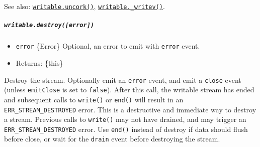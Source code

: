 See also: \hyperref[writableuncork]{\texttt{writable.uncork()}},
\hyperref[writable_writevchunks-callback]{\texttt{writable.\_writev()}}.

\subparagraph{\texorpdfstring{\texttt{writable.destroy({[}error{]})}}{writable.destroy({[}error{]})}}\label{writable.destroyerror}

\begin{itemize}
\tightlist
\item
  \texttt{error} \{Error\} Optional, an error to emit with
  \texttt{\textquotesingle{}error\textquotesingle{}} event.
\item
  Returns: \{this\}
\end{itemize}

Destroy the stream. Optionally emit an
\texttt{\textquotesingle{}error\textquotesingle{}} event, and emit a
\texttt{\textquotesingle{}close\textquotesingle{}} event (unless
\texttt{emitClose} is set to \texttt{false}). After this call, the
writable stream has ended and subsequent calls to \texttt{write()} or
\texttt{end()} will result in an \texttt{ERR\_STREAM\_DESTROYED} error.
This is a destructive and immediate way to destroy a stream. Previous
calls to \texttt{write()} may not have drained, and may trigger an
\texttt{ERR\_STREAM\_DESTROYED} error. Use \texttt{end()} instead of
destroy if data should flush before close, or wait for the
\texttt{\textquotesingle{}drain\textquotesingle{}} event before
destroying the stream.

\begin{Shaded}
\begin{Highlighting}[]
\OperatorTok{=} \NormalTok{(}\NormalTok{)}\OperatorTok{;}

\OperatorTok{=}  \NormalTok{()}\OperatorTok{;}

\OperatorTok{=}  \NormalTok{(}\NormalTok{)}\OperatorTok{;}
\OperatorTok{;}
\NormalTok{(}\OperatorTok{,}\KeywordTok{=\textgreater{}} \NormalTok{))}\OperatorTok{;} 
\end{Highlighting}
\end{Shaded}

